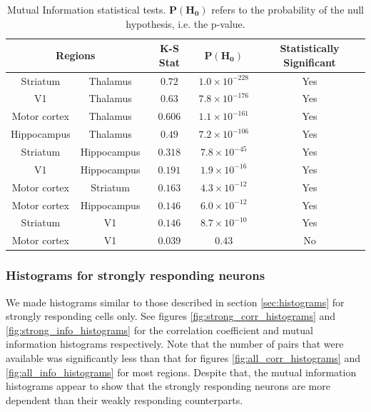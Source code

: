 \documentclass[a4paper,12pt]{article}
\theoremstyle{definition}
\begin{document}
\begin{table}[ht!]
  \begin{center}
    \caption{Mutual Information statistical tests. $\mathbf{P(H_0)}$ refers to the probability of the null hypothesis, i.e. the p-value.}
    \label{tab:info_ks_test}
    \begin{tabular}{c|c|c|c|c} %
      \multicolumn{2}{c|}{\textbf{Regions}} & \textbf{K-S Stat} & $\mathbf{P(H_0)}$ & \textbf{Statistically Significant}\\
      \hline
      Striatum & Thalamus & $0.72$ & $1.0 \times 10^{-228}$ & Yes \\
      V1 & Thalamus  & $0.63$ & $7.8 \times 10^{-176}$ & Yes \\
      Motor cortex & Thalamus & $0.606$ & $1.1 \times 10^{-161}$ & Yes \\
      Hippocampus & Thalamus  & $0.49$ & $7.2 \times 10^{-106}$ & Yes \\
      Striatum & Hippocampus & $0.318$ & $7.8 \times 10^{-45}$ & Yes \\
      V1 & Hippocampus & $0.191$ & $1.9 \times 10^{-16}$ & Yes \\
      Motor cortex & Striatum & $0.163$ & $4.3 \times 10^{-12}$ & Yes \\
      Motor cortex & Hippocampus & $0.146$ & $6.0 \times 10^{-12}$ & Yes \\
      Striatum & V1 & $0.146$ & $8.7 \times 10^{-10}$ & Yes \\
      Motor cortex & V1 & $0.039$ & $0.43$ & No \\
    \end{tabular}
  \end{center}
\end{table}

\subsubsection{Histograms for strongly responding neurons}
We made histograms similar to those described in section \ref{sec:histograms} for strongly responding cells only. See figures \ref{fig:strong_corr_histograms} and \ref{fig:strong_info_histograms} for the correlation coefficient and mutual information histograms respectively. Note that the number of pairs that were available was significantly less than that for figures \ref{fig:all_corr_histograms} and \ref{fig:all_info_histograms} for most regions. Despite that, the mutual information histograms appear to show that the strongly responding neurons are more dependent than their weakly responding counterparts.
\end{document}
